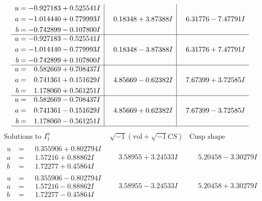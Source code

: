 \documentclass[1p]{elsarticle_modified}
\theoremstyle{definition}
\newcommand{\I}{\sqrt{-1}}
\begin{document}
$$\begin{array}{c|c|c}
\begin{aligned}
u &= -0.927183 + 0.525541 I \\
a &= -1.014440 + 0.779993 I \\
b &= -0.742899 - 0.107800 I\end{aligned}
 & \phantom{-}0.18348 + 3.87388 I & \phantom{-}6.31776 - 7.47791 I \\ \hline\begin{aligned}
u &= -0.927183 - 0.525541 I \\
a &= -1.014440 - 0.779993 I \\
b &= -0.742899 + 0.107800 I\end{aligned}
 & \phantom{-}0.18348 - 3.87388 I & \phantom{-}6.31776 + 7.47791 I \\ \hline\begin{aligned}
u &= \phantom{-}0.582669 + 0.708437 I \\
a &= \phantom{-}0.741361 + 0.151629 I \\
b &= \phantom{-}1.178060 + 0.561251 I\end{aligned}
 & \phantom{-}4.85669 - 0.62382 I & \phantom{-}7.67399 + 3.72585 I \\ \hline\begin{aligned}
u &= \phantom{-}0.582669 - 0.708437 I \\
a &= \phantom{-}0.741361 - 0.151629 I \\
b &= \phantom{-}1.178060 - 0.561251 I\end{aligned}
 & \phantom{-}4.85669 + 0.62382 I & \phantom{-}7.67399 - 3.72585 I\\
 \hline 
 \end{array}$$\newpage$$\begin{array}{c|c|c}  
\text{Solutions to }I^u_{1}& \I (\text{vol} + \sqrt{-1}CS) & \text{Cusp shape}\\
 \hline 
\begin{aligned}
u &= \phantom{-}0.355906 + 0.802794 I \\
a &= \phantom{-}1.57216 + 0.88862 I \\
b &= \phantom{-}1.72277 + 0.45864 I\end{aligned}
 & \phantom{-}3.58955 + 3.24533 I & \phantom{-}5.20458 - 3.30279 I \\ \hline\begin{aligned}
u &= \phantom{-}0.355906 - 0.802794 I \\
a &= \phantom{-}1.57216 - 0.88862 I \\
b &= \phantom{-}1.72277 - 0.45864 I\end{aligned}
 & \phantom{-}3.58955 - 3.24533 I & \phantom{-}5.20458 + 3.30279 I \\ \hline\begin{aligned}

\end{aligned}
\end{array}$$
\end{document}
